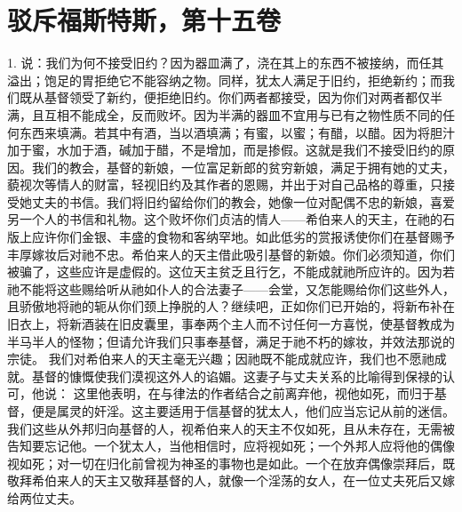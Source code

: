 

\section{驳斥福斯特斯，第十五卷}

\par

1. 说：我们为何不接受旧约？因为器皿满了，浇在其上的东西不被接纳，而任其溢出；饱足的胃拒绝它不能容纳之物。同样，犹太人满足于旧约，拒绝新约；而我们既从基督领受了新约，便拒绝旧约。你们两者都接受，因为你们对两者都仅半满，且互相不能成全，反而败坏。因为半满的器皿不宜用与已有之物性质不同的任何东西来填满。若其中有酒，当以酒填满；有蜜，以蜜；有醋，以醋。因为将胆汁加于蜜，水加于酒，碱加于醋，不是增加，而是掺假。这就是我们不接受旧约的原因。我们的教会，基督的新娘，一位富足新郎的贫穷新娘，满足于拥有她的丈夫，藐视次等情人的财富，轻视旧约及其作者的恩赐，并出于对自己品格的尊重，只接受她丈夫的书信。我们将旧约留给你们的教会，她像一位对配偶不忠的新娘，喜爱另一个人的书信和礼物。这个败坏你们贞洁的情人——希伯来人的天主，在祂的石版上应许你们金银、丰盛的食物和客纳罕地。如此低劣的赏报诱使你们在基督赐予丰厚嫁妆后对祂不忠。希伯来人的天主借此吸引基督的新娘。你们必须知道，你们被骗了，这些应许是虚假的。这位天主贫乏且行乞，不能成就祂所应许的。因为若祂不能将这些赐给听从祂如仆人的合法妻子——会堂，又怎能赐给你们这些外人，且骄傲地将祂的轭从你们颈上挣脱的人？继续吧，正如你们已开始的，将新布补在旧衣上，将新酒装在旧皮囊里，事奉两个主人而不讨任何一方喜悦，使基督教成为半马半人的怪物；但请允许我们只事奉基督，满足于祂不朽的嫁妆，并效法那说的宗徒。 我们对希伯来人的天主毫无兴趣；因祂既不能成就应许，我们也不愿祂成就。基督的慷慨使我们漠视这外人的谄媚。这妻子与丈夫关系的比喻得到保禄的认可，他说： 这里他表明，在与律法的作者结合之前离弃他，视他如死，而归于基督，便是属灵的奸淫。这主要适用于信基督的犹太人，他们应当忘记从前的迷信。我们这些从外邦归向基督的人，视希伯来人的天主不仅如死，且从未存在，无需被告知要忘记他。一个犹太人，当他相信时，应将视如死；一个外邦人应将他的偶像视如死；对一切在归化前曾视为神圣的事物也是如此。一个在放弃偶像崇拜后，既敬拜希伯来人的天主又敬拜基督的人，就像一个淫荡的女人，在一位丈夫死后又嫁给两位丈夫。\par

